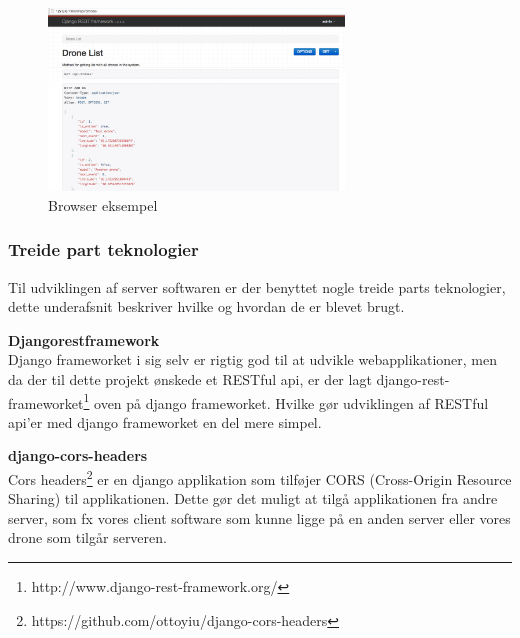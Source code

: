\begin{figure}[H]
	\centering
	\includegraphics[width=0.7\textwidth]{Billeder/implementation/browser_eksempel.png}
	\caption{Browser eksempel}
	\label{fig:browser_eksempel}
\end{figure}

\subsubsection{Treide part teknologier}
Til udviklingen af server softwaren er der benyttet nogle treide parts teknologier, dette underafsnit beskriver hvilke og hvordan de er blevet brugt.

\textbf{Djangorestframework}\\
Django frameworket i sig selv er rigtig god til at udvikle webapplikationer, men da der til dette projekt ønskede et RESTful api, er der lagt django-rest-frameworket\footnote{http://www.django-rest-framework.org/} oven på django frameworket. Hvilke gør udviklingen af RESTful api'er med django frameworket en del mere simpel.  

\textbf{django-cors-headers}\\
Cors headers\footnote{https://github.com/ottoyiu/django-cors-headers} er en django applikation som tilføjer CORS (Cross-Origin Resource Sharing) til applikationen. Dette gør det muligt at tilgå applikationen fra andre server, som fx vores client software som kunne ligge på en anden server eller vores drone som tilgår serveren. 